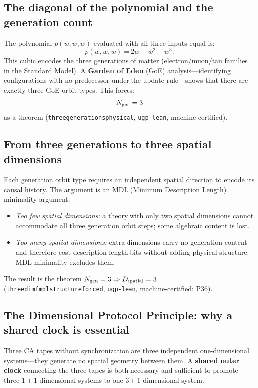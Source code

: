 \documentclass[11pt,a4paper]{article}
\newcommand{\term}[1]{\textbf{#1}}
\newcommand{\lean}[1]{\begingroup\def\_{\textunderscore\allowbreak}\texttt{#1}\endgroup}
\begin{document}
\subsection{The diagonal of the polynomial and the generation count}

The polynomial $p(w,w,w)$ evaluated with all three inputs equal is:
\[
  p(w,w,w) = 2w - w^2 - w^3.
\]
This cubic encodes the three generations of matter (electron/muon/tau families in
the Standard Model).  A \term{Garden of Eden} (GoE) analysis---identifying
configurations with no predecessor under the update rule---shows that there are
exactly three GoE orbit types.  This forces:
\[
  N_{\rm gen} = 3
\]
as a theorem (\lean{three\_generations\_physical}, \texttt{ugp-lean}, machine-certified).

\subsection{From three generations to three spatial dimensions}

Each generation orbit type requires an independent spatial direction to encode its
causal history.  The argument is an MDL (Minimum Description Length) minimality
argument:

\begin{itemize}[leftmargin=1.5em,nosep]
\item \textit{Too few spatial dimensions:} a theory with only two spatial dimensions
  cannot accommodate all three generation orbit steps; some algebraic content is lost.
\item \textit{Too many spatial dimensions:} extra dimensions carry no generation
  content and therefore cost description-length bits without adding physical structure.
  MDL minimality excludes them.
\end{itemize}

The result is the theorem $N_{\rm gen} = 3 \Rightarrow D_{\rm spatial} = 3$
(\lean{three\_dim\_fmdl\_structure\_forced}, \texttt{ugp-lean}, machine-certified; P36).

\subsection{The Dimensional Protocol Principle: why a shared clock is essential}

Three CA tapes without synchronization are three independent one-dimensional
systems---they generate no spatial geometry between them.
A \term{shared outer clock} connecting the three tapes is both necessary and sufficient
to promote three $1{+}1$-dimensional systems to one $3{+}1$-dimensional system.
\end{document}
